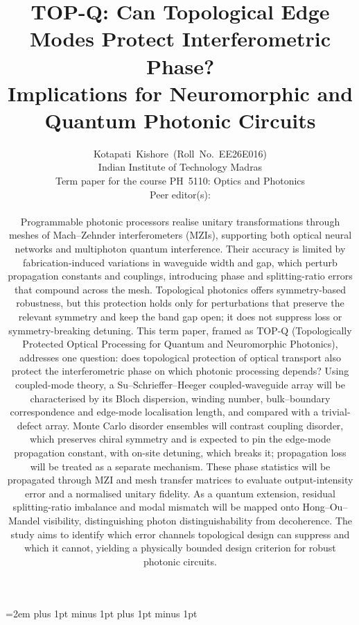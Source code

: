 \documentclass[journal,11pt]{IEEEtran}
\def\peereditors{}
\begin{document}
  \emergencystretch=2em     
\abovedisplayskip=5pt plus 1pt minus 1pt \belowdisplayskip=5pt plus 1pt minus 1pt
\abovedisplayshortskip=3pt \belowdisplayshortskip=4pt

\title{\LARGE TOP-Q: Can Topological Edge Modes Protect Interferometric Phase?\\
Implications for Neuromorphic and Quantum Photonic Circuits}

\author{Kotapati~Kishore~(Roll~No.~EE26E016)\\
Indian Institute of Technology Madras\\
Term paper for the course PH~5110: Optics and Photonics%
\ifx\peereditors\empty\else\\ Peer editor(s): \peereditors\fi\\[10pt]\parbox{\textwidth}{\normalfont\normalsize\justifying{}\par\vspace{3pt}Programmable photonic processors realise unitary transformations through meshes of Mach--Zehnder interferometers (MZIs), supporting both optical neural networks and multiphoton quantum interference. Their accuracy is limited by fabrication-induced variations in waveguide width and gap, which perturb propagation constants and couplings, introducing phase and splitting-ratio errors that compound across the mesh. Topological photonics offers symmetry-based robustness, but this protection holds only for perturbations that preserve the relevant symmetry and keep the band gap open; it does not suppress loss or symmetry-breaking detuning. This term paper, framed as TOP-Q (Topologically Protected Optical Processing for Quantum and Neuromorphic Photonics), addresses one question: does topological protection of optical transport also protect the interferometric phase on which photonic processing depends? Using coupled-mode theory, a Su--Schrieffer--Heeger coupled-waveguide array will be characterised by its Bloch dispersion, winding number, bulk--boundary correspondence and edge-mode localisation length, and compared with a trivial-defect array. Monte Carlo disorder ensembles will contrast coupling disorder, which preserves chiral symmetry and is expected to pin the edge-mode propagation constant, with on-site detuning, which breaks it; propagation loss will be treated as a separate mechanism. These phase statistics will be propagated through MZI and mesh transfer matrices to evaluate output-intensity error and a normalised unitary fidelity. As a quantum extension, residual splitting-ratio imbalance and modal mismatch will be mapped onto Hong--Ou--Mandel visibility, distinguishing photon distinguishability from decoherence. The study aims to identify which error channels topological design can suppress and which it cannot, yielding a physically bounded design criterion for robust photonic circuits.\par\vspace{-22pt}}}
\end{document}
